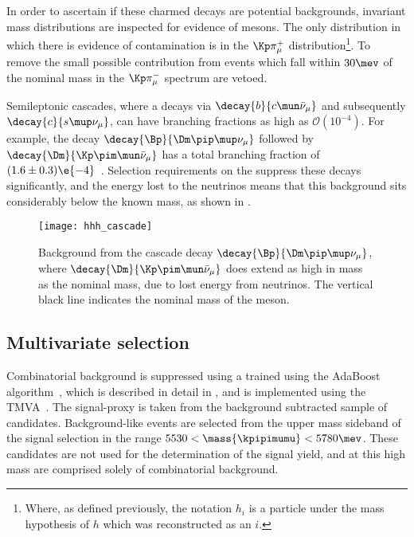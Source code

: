 In order to ascertain if these charmed decays are potential backgrounds, invariant mass
distributions are inspected for evidence of \Dz mesons.
The only distribution in which there is evidence of contamination is in the
$\Kp\pi^+_\mu$ distribution\footnote{
  Where, as defined previously, the notation $h_i$ is a particle under the mass hypothesis of $h$
  which was reconstructed as an $i$.
}.
To remove the small possible contribution from \decay{\Bd}{\Dzb\pip\pipi} events which fall within
$30\mev$ of the nominal \Dz mass in the $\Kp\pi^-_\mu$ spectrum are vetoed.


Semileptonic cascades, where a \bquark decays via $\decay{b}{c\mun\bar\nu_\mu}$ and subsequently
$\decay{c}{s\mup\nu_\mu}$, can have branching fractions as high as $\mathcal{O}(10^{-4})$.
For example, the decay $\decay{\Bp}{\Dm\pip\mup\nu_\mu}$ followed by
$\decay{\Dm}{\Kp\pim\mun\bar\nu_\mu}$ has a total branching fraction of
$(1.6\pm0.3)\e{-4}$~\cite{PDG2014}.
Selection requirements on the \chisqvtx suppress these decays significantly, and the energy lost to
the neutrinos means that this background sits considerably below the known \Bp mass, as shown in
.

\begin{figure}
  \begin{center}
    \texttt{[image: hhh\_cascade]}
    \caption[Simulated background from cascade decays]
    {
      Background from the cascade decay $\decay{\Bp}{\Dm\pip\mup\nu_\mu}$, where
      $\decay{\Dm}{\Kp\pim\mun\bar\nu_\mu}$ does extend as high in mass as the nominal \Bp mass,
      due to lost energy from neutrinos.
      The vertical black line indicates the nominal mass of the \Bp meson.
    }
    \label{fig:hhh:cascade}
  \end{center}
\end{figure}


\subsection{Multivariate selection}
\label{sec:hhh:bdt}
Combinatorial background is suppressed using a \BDT trained using the AdaBoost
algorithm~\cite{AdaBoost}, which is described in detail in , and is implemented
using the \gls{TMVA}~\cite{Hocker:2007ht}.
The signal-proxy is taken from the background subtracted sample of \btojpsikpipi candidates.
Background-like events are selected from the upper mass sideband of the signal selection in the
range $5530<\mass{\kpipimumu}<5780\mev$.
These candidates are not used for the determination of the signal yield, and at this high mass are
comprised solely of combinatorial background.

